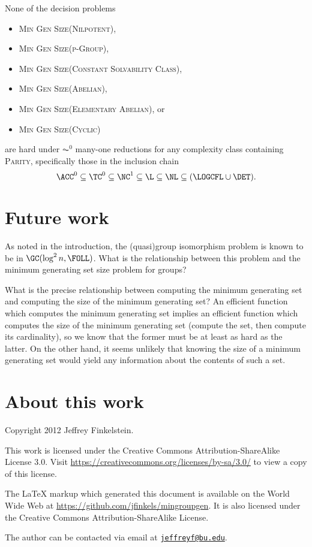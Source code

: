 \documentclass{article}
\newcommand{\email}[1]{\href{mailto:#1}{\nolinkurl{#1}}}
\begin{document}
\begin{theorem}
  None of the decision problems
  \begin{itemize}
  \item \textsc{Min Gen Size(Nilpotent)},
  \item \textsc{Min Gen Size(p-Group)},
  \item \textsc{Min Gen Size(Constant Solvability Class)},
  \item \textsc{Min Gen Size(Abelian)},
  \item \textsc{Min Gen Size(Elementary Abelian)}, or
  \item \textsc{Min Gen Size(Cyclic)}
  \end{itemize}
  are hard under $\AC^0$ many-one reductions for any complexity class containing \textsc{Parity}, specifically those in the inclusion chain
  \begin{equation*}
    \ACC^0 \subseteq \TC^0 \subseteq \NC^1 \subseteq \L \subseteq \NL \subseteq (\LOGCFL \cup \DET).
  \end{equation*}
\end{theorem}

\section{Future work}

As noted in the introduction, the (quasi)group isomorphism problem is known to be in $\GC(\log^2 n, \FOLL)$.
What is the relationship between this problem and the minimum generating set size problem for groups?

What is the precise relationship between computing the minimum generating set and computing the size of the minimum generating set?
An efficient function which computes the minimum generating set implies an efficient function which computes the size of the minimum generating set (compute the set, then compute its cardinality), so we know that the former must be at least as hard as the latter.
On the other hand, it seems unlikely that knowing the size of a minimum generating set would yield any information about the contents of such a set.

\section{About this work}

Copyright 2012 Jef{}frey Finkelstein.

This work is licensed under the Creative Commons Attribution-ShareAlike License 3.0.
Visit \mbox{\url{https://creativecommons.org/licenses/by-sa/3.0/}} to view a copy of this license.

The \LaTeX{} markup which generated this document is available on the World Wide Web at \mbox{\url{https://github.com/jfinkels/mingroupgen}}.
It is also licensed under the Creative Commons Attribution-ShareAlike License.

The author can be contacted via email at \email{jeffreyf@bu.edu}.




\appendix

\end{document}
